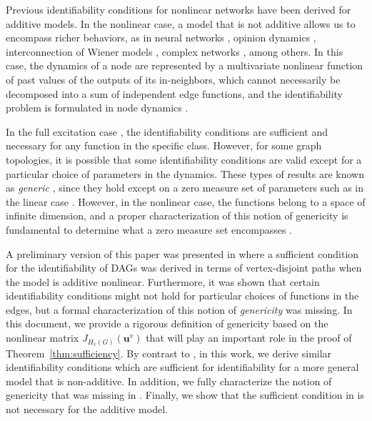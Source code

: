 \documentclass[letterpaper,10pt,journal]{IEEEtran}
\newcommand{\uu}{\mathbf{u}}
\begin{document}
Previous identifiability conditions for nonlinear networks have been derived for additive models. 
In the nonlinear case, a model that is not additive allows us to encompass richer behaviors, as in neural networks \cite{aggarwal2018neural}, opinion dynamics \cite{bizyaeva2023nonlinear}, interconnection of Wiener models \cite{bonassi2024structured}, complex networks \cite{zanudo2017structure}, among others. In this case, the dynamics of a node are represented by a multivariate nonlinear function of past values of the outputs of its in-neighbors, which cannot necessarily be decomposed into a sum of independent edge functions, and the identifiability problem is formulated in node dynamics \cite{vanelli2025local}.
 

In the full excitation case \cite{vizuete2023nonlinear,vizuete2026nonlinear}, the identifiability conditions are sufficient and necessary for any function in the specific class. However, for some graph topologies, it is possible that some identifiability conditions are valid except for a particular choice of parameters in the dynamics.  
These types of results are known as \emph{generic} \cite{van1991graph}, since they hold except on a zero measure set of parameters such as in the linear case \cite{hendrickx2019identifiability,mapurunga2023identifiability,legat2024identifiability}. However, in the nonlinear case, the functions belong to a space of infinite dimension, and a proper characterization of this notion of genericity is fundamental to determine what a zero measure set encompasses \cite{vanelli2025local}.


A preliminary version of this paper was presented in \cite{vizuete2024partial} where a sufficient condition for the identifiability of DAGs was derived in terms of vertex-disjoint paths when the model is additive nonlinear. Furthermore, it was shown that certain identifiability conditions might not hold for particular choices of functions in the edges, but a formal characterization of this notion of \emph{genericity} was missing. 
In this document, we provide a rigorous definition of genericity based on the nonlinear matrix $J_{H_v(G)}(\uu^v)$ that will play an important role in the proof of Theorem~\ref{thm:sufficiency}.
By contrast to \cite{vizuete2024partial}, in this work, we derive similar identifiability conditions which are sufficient for identifiability for a more general model that is non-additive. In addition, we fully characterize the notion of genericity that was missing in \cite{vizuete2024partial}. Finally, we show that the sufficient condition in \cite{vizuete2024partial} is not necessary for the additive model.
\end{document}
